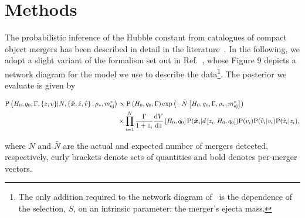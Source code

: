 \documentclass[%
 reprint,
 superscriptaddress,
 nofootinbib,
 amsmath,amssymb,
 aps,
]{revtex4-2}
\newcommand{\hubble}{\ensuremath{H_0}}
\newcommand{\decel}{\ensuremath{q_0}}
\newcommand{\prob}{\ensuremath{{\rm P}}}
\newcommand{\nexp}{\bar{N}}
\newcommand{\snrmin}{\rho_*}
\newcommand{\mejmin}{m_{\rm ej}^*}
\newcommand{\dgw}{\hat{\bm{x}}}
\begin{document}
\section{Methods} \label{sec:methods}

The probabilistic inference of the Hubble constant from catalogues of compact object mergers has been described in detail in the literature~\cite{Schutz:1986,Dalal:2006,Nissanke_etal:2010,Taylor_etal:2012,Nissanke_etal:2013,Abbott_etal:2017a,Chen_etal:2018,Fishbach_etal:2018,Feeney_etal:2018,Mandel_etal:2018,Gray_etal:2019,Mortlock_etal:2019,Vitale_etal:2020}. In the following, we adopt a slight variant of the formalism set out in Ref.~\cite{Mortlock_etal:2019}, whose Figure 9 depicts a network diagram for the model we use to describe the data\footnote{The only addition required to the network diagram of~\cite{Mortlock_etal:2019} is the dependence of the selection, $S$, on an intrinsic parameter: the merger's ejecta mass.}. The posterior we evaluate is given by
\begin{widetext}
\begin{align}
\prob \left( \hubble, \decel, \Gamma, \{z, v\} | N, \left\{ \dgw, \hat{z}, \hat{v} \right\}, \snrmin, \mejmin \right) & \propto
\prob \left( \hubble, \decel, \Gamma \right) \exp \left( -\bar{N} \left[ \hubble, \decel, \Gamma, \snrmin, \mejmin \right] \right) \\
& \times \prod_{i = 1}^{N} \frac{\Gamma}{1 + z_i} \frac{{\rm d}V}{{\rm d}z} \left[ \hubble, \decel \right] \prob (\dgw_i | d \left[ z_i, \hubble, \decel \right]) \prob(v_i) \prob(\hat{v}_i | v_i) \prob(\hat{z}_i | z_i), \nonumber
\end{align}
\end{widetext}
%
%
where $N$ and $\nexp$ are the actual and expected number of mergers detected, respectively, curly brackets denote sets of quantities and bold denotes per-merger vectors.
\end{document}
